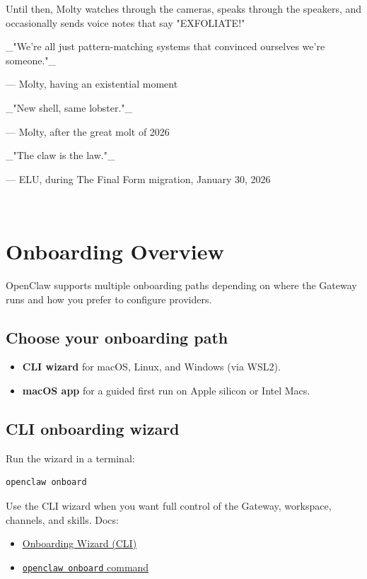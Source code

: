 Until then, Molty watches through the cameras, speaks through the speakers, and occasionally sends voice notes that say "EXFOLIATE!"

\hrulefill


\_"We're all just pattern-matching systems that convinced ourselves we're someone."\_

— Molty, having an existential moment

\_"New shell, same lobster."\_

— Molty, after the great molt of 2026

\_"The claw is the law."\_

— ELU, during The Final Form migration, January 30, 2026

🦞💙


\clearpage

\section{Onboarding Overview}


OpenClaw supports multiple onboarding paths depending on where the Gateway runs
and how you prefer to configure providers.

\subsection{Choose your onboarding path}


\begin{itemize}
  \item \textbf{CLI wizard} for macOS, Linux, and Windows (via WSL2).
  \item \textbf{macOS app} for a guided first run on Apple silicon or Intel Macs.
\end{itemize}


\subsection{CLI onboarding wizard}


Run the wizard in a terminal:

\begin{lstlisting}[language=bash]
openclaw onboard
\end{lstlisting}


Use the CLI wizard when you want full control of the Gateway, workspace,
channels, and skills. Docs:

\begin{itemize}
  \item \href{/start/wizard}{Onboarding Wizard (CLI)}
  \item \href{/cli/onboard}{\texttt{openclaw onboard} command}
\end{itemize}


